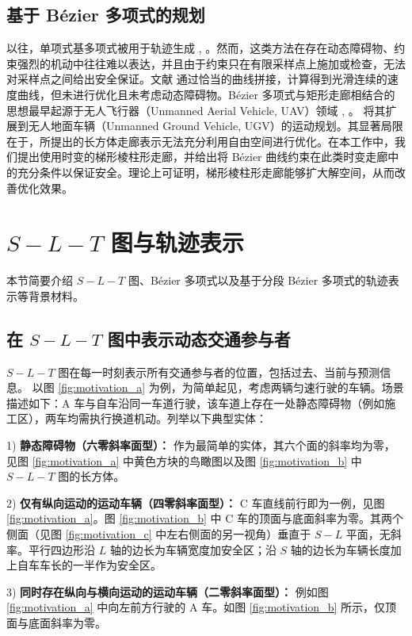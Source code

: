 \documentclass[UTF8,a4paper,12pt,fontset=none]{ctexart}
\theoremstyle{definition}
\theoremstyle{plain}
\theoremstyle{plain}
\theoremstyle{plain}
\begin{document}
\subsection{基于 B\'{e}zier 多项式的规划}

以往，单项式基多项式被用于轨迹生成 \cite{werling_optimal_2012}, \cite{fan_baidu_2018}。然而，这类方法在存在动态障碍物、约束强烈的机动中往往难以表达，并且由于约束只在有限采样点上施加或检查，无法对采样点之间给出安全保证。文献 \cite{gonzalez_speed_2016} 通过恰当的曲线拼接，计算得到光滑连续的速度曲线，但未进行优化且未考虑动态障碍物。B\'{e}zier 多项式与矩形走廊相结合的思想最早起源于无人飞行器（Unmanned Aerial Vehicle, UAV）领域 \cite{gao_online_2018}, \cite{zhou_robust_2019}。\citet{ding_safe_2019} 将其扩展到无人地面车辆（Unmanned Ground Vehicle, UGV）的运动规划。其显著局限在于，所提出的长方体走廊表示无法充分利用自由空间进行优化。在本工作中，我们提出使用时变的梯形棱柱形走廊，并给出将 B\'{e}zier 曲线约束在此类时变走廊中的充分条件以保证安全。理论上可证明，梯形棱柱形走廊能够扩大解空间，从而改善优化效果。

\section{$S-L-T$ 图与轨迹表示}

本节简要介绍 $S-L-T$ 图、B\'{e}zier 多项式以及基于分段 B\'{e}zier 多项式的轨迹表示等背景材料。

\subsection{在 $S-L-T$ 图中表示动态交通参与者}
$S − L − T$ 图在每一时刻表示所有交通参与者的位置，包括过去、当前与预测信息。
以图 \ref{fig:motivation_a} 为例，为简单起见，考虑两辆匀速行驶的车辆。场景描述如下：A 车与自车沿同一车道行驶，该车道上存在一处静态障碍物（例如施工区），两车均需执行换道机动。列举以下典型实体：

 1) \textbf{静态障碍物（六零斜率面型）：} 作为最简单的实体，其六个面的斜率均为零，见图 \ref{fig:motivation_a} 中黄色方块的鸟瞰图以及图 \ref{fig:motivation_b} 中 $S-L-T$ 图的长方体。

 2) \textbf{仅有纵向运动的运动车辆（四零斜率面型）：} C 车直线前行即为一例，见图 \ref{fig:motivation_a}。图 \ref{fig:motivation_b} 中 C 车的顶面与底面斜率为零。其两个侧面（见图 \ref{fig:motivation_c} 中左右侧面的另一视角）垂直于 $S-L$ 平面，无斜率。平行四边形沿 $L$ 轴的边长为车辆宽度加安全区；沿 $S$ 轴的边长为车辆长度加上自车车长的一半作为安全区。

 3) \textbf{同时存在纵向与横向运动的运动车辆（二零斜率面型）：} 例如图 \ref{fig:motivation_a} 中向左前方行驶的 A 车。如图 \ref{fig:motivation_b} 所示，仅顶面与底面斜率为零。
\end{document}
